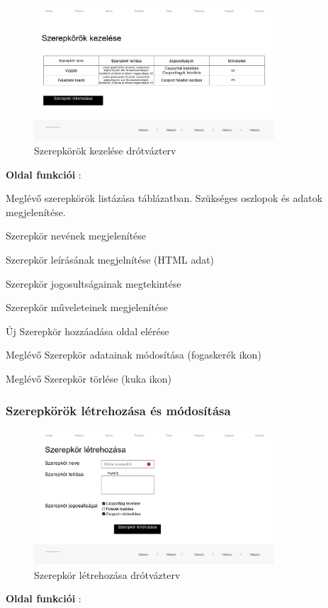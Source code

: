 \begin{figure}[H]
	\centering
	\includegraphics[width=0.8\textwidth]{images/szerepkorok_kezelese_wire.png}
	\caption{Szerepkörök kezelése drótvázterv}
\end{figure}
\textbf{Oldal funkciói} :

\begin{compactitem}
	\item Meglévő szerepkörök listázása táblázatban. Szükséges oszlopok és adatok megjelenítése.
        \begin{compactitem}
            \item Szerepkör nevének megjelenítése
            \item Szerepkör leírásának megjelnítése (HTML adat)
            \item Szerepkör jogosultságainak megtekintése
            \item Szerepkör műveleteinek megjelenítése
        \end{compactitem}
        \item Új Szerepkör hozzáadása oldal elérése
        \item Meglévő Szerepkör adatainak módosítása (fogaskerék ikon)
        \item Meglévő Szerepkör törlése (kuka ikon)
 \end{compactitem}

\subsubsection{Szerepkörök létrehozása és módosítása}

\begin{figure}[H]
	\centering
	\includegraphics[width=0.8\textwidth]{images/szerepkor_letrehozasa_wire.png}
	\caption{Szerepkör létrehozása drótvázterv}
\end{figure}
\textbf{Oldal funkciói} :

